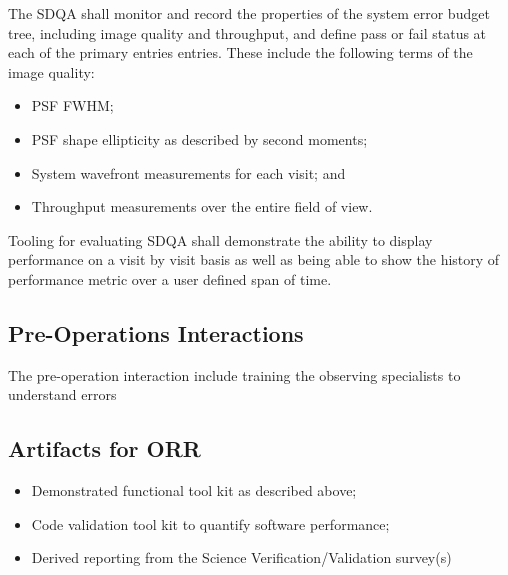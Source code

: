 The SDQA shall monitor and record the properties of the system error budget tree, including image quality and throughput, and define pass or fail status at each of the primary entries entries.   These include the following terms of the image quality: 

\begin{itemize}

	\item PSF FWHM;
	\item PSF shape ellipticity as described by second moments;
	\item System wavefront measurements for each visit; and
	\item Throughput measurements over the entire field of view.
		
\end{itemize}

Tooling for evaluating SDQA shall demonstrate the ability to display performance on a visit by visit basis as well as being able to show the history of performance metric over a user defined span of time.

\subsection{Pre-Operations Interactions}
The pre-operation interaction include training the observing specialists to understand errors 

\subsection{Artifacts for ORR}

\begin{itemize}

	\item Demonstrated functional tool kit as described above;
	\item Code validation tool kit to quantify software performance;
	\item Derived reporting from the Science Verification/Validation survey(s)
	
\end{itemize}





